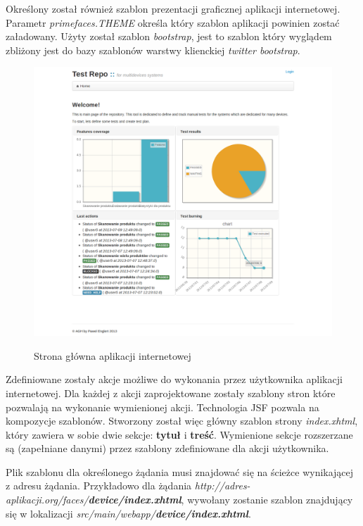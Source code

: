 Określony został również szablon prezentacji graficznej aplikacji internetowej. Parametr \textit{primefaces.THEME} określa który szablon aplikacji powinien zostać załadowany. Użyty został szablon \textit{bootstrap}, jest to szablon który wyglądem zbliżony jest do bazy szablonów warstwy klienckiej \textit{twitter bootstrap}.
\begin{figure}
  \begin{center}
    \includegraphics[scale=0.4]{img/screen/Welcome.png}
    \label{fig:stronaGlowna}
    \caption{Strona główna aplikacji internetowej}
  \end{center}
\end{figure}

Zdefiniowane zostały akcje możliwe do wykonania przez użytkownika aplikacji internetowej. Dla każdej z akcji zaprojektowane zostały szablony stron które pozwalają na wykonanie wymienionej akcji. Technologia JSF pozwala na kompozycje szablonów. Stworzony został więc główny szablon strony \textit{index.xhtml}, który zawiera w sobie dwie sekcje: \textbf{tytuł} i \textbf{treść}. Wymienione sekcje rozszerzane są (zapełniane danymi) przez szablony zdefiniowane dla akcji użytkownika.

Plik szablonu dla określonego żądania musi znajdować się na ścieżce wynikającej z adresu żądania. Przykładowo dla żądania \textit{http://adres-aplikacji.org/faces/\textbf{device/index.xhtml}}, wywołany zostanie szablon znajdujący się w lokalizacji \textit{src/main/webapp/\textbf{device/index.xhtml}}.

